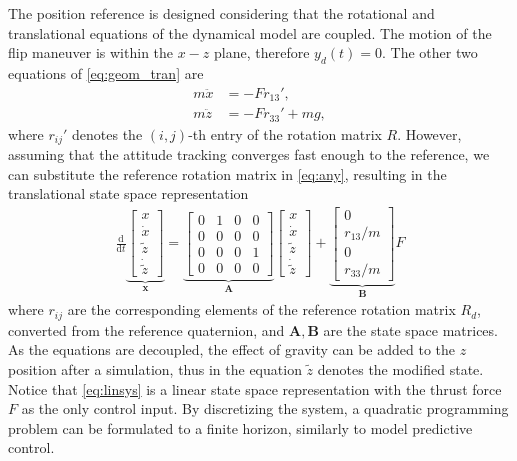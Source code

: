 The position reference is designed considering that the rotational and translational equations of the dynamical model are coupled. The motion of the flip maneuver is within the $x-z$ plane, therefore $y_d(t) = 0$. The other two equations of \eqref{eq:geom_tran} are
\begin{subequations}\label{eq:any}
    \begin{align}
       m \ddot x & = - Fr_{13}',\\
        m \ddot{z} & = - F r_{33}' + mg,  
    \end{align}
\end{subequations}
where $r_{ij}'$ denotes the $(i, j)$-th entry of the rotation matrix $R$. However, assuming that the attitude tracking converges fast enough to the reference, we can substitute the reference rotation matrix in \eqref{eq:any}, resulting in the translational state space representation
    \begin{align}\label{eq:linsys}
    \frac{\mathrm{d}}{\mathrm{d}t} \underbrace{\begin{bmatrix} x \\ \dot x \\ \tilde z \\ \dot{\tilde{z}}\end{bmatrix}}_{\mathbf{x}} = \underbrace{\begin{bmatrix} 0 & 1 & 0 & 0 \\ 0 & 0 & 0 & 0 \\ 0 & 0 & 0 & 1 \\ 0 & 0 & 0 & 0 \end{bmatrix}}_{\mathbf{A}} \begin{bmatrix} x \\ \dot x \\ \tilde z \\ \dot{\tilde{z}} \end{bmatrix} + \underbrace{\begin{bmatrix} 0 \\ r_{13}/m \\ 0 \\ r_{33}/m \end{bmatrix}}_{\mathbf{B}}  F
    \end{align}
where $r_{ij}$ are the corresponding elements of the reference rotation matrix $R_d$, converted from the reference quaternion, and $\mathbf A, \mathbf B$ are the state space matrices. As the equations are decoupled, the effect of gravity can be added to the $z$ position after a simulation, thus in the equation $\tilde{z}$ denotes the modified state. Notice that \eqref{eq:linsys} is a linear state space representation with the thrust force $F$ as the only control input. By discretizing the system, a quadratic programming problem can be formulated to a finite horizon, similarly to model predictive control.

